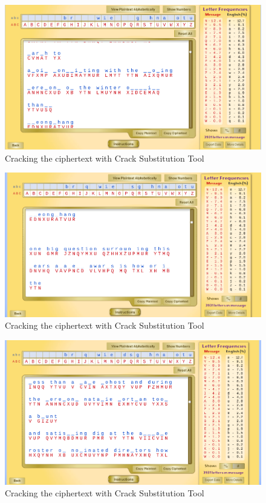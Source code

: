 \documentclass[12pt]{article}
\begin{document}
\begin{figure}[!ht]
    \begin{center}
        \includegraphics[scale=0.48]{c9.png}
    \end{center}{}
    \caption{Cracking the ciphertext with Crack Substitution Tool}
    \label{fig:c9}
\end{figure}

\begin{figure}[!ht]
    \begin{center}
        \includegraphics[scale=0.48]{c10.png}
    \end{center}{}
    \caption{Cracking the ciphertext with Crack Substitution Tool}
    \label{fig:c10}
\end{figure}

\begin{figure}[!ht]
    \begin{center}
        \includegraphics[scale=0.48]{c11.png}
    \end{center}{}
    \caption{Cracking the ciphertext with Crack Substitution Tool}
    \label{fig:c11}
\end{figure}
\end{document}
